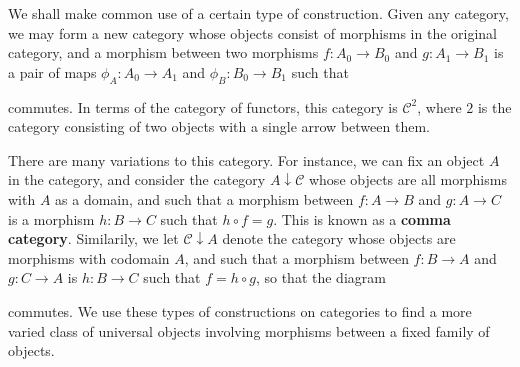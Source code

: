We shall make common use of a certain type of construction. Given any category, we may form a new category whose objects consist of morphisms in the original category, and a morphism between two morphisms $f: A_0 \to B_0$ and $g: A_1 \to B_1$ is a pair of maps $\phi_A: A_0 \to A_1$ and $\phi_B: B_0 \to B_1$ such that
%
\begin{center}
\end{center}
%
commutes. In terms of the category of functors, this category is $\mathcal{C}^2$, where $2$ is the category consisting of two objects with a single arrow between them.

There are many variations to this category. For instance, we can fix an object $A$ in the category, and consider the category $A \downarrow \mathcal{C}$ whose objects are all morphisms with $A$ as a domain, and such that a morphism between $f: A \to B$ and $g: A \to C$ is a morphism $h: B \to C$ such that $h \circ f = g$. This is known as a {\bf comma category}. Similarily, we let $\mathcal{C} \downarrow A$ denote the category whose objects are morphisms with codomain $A$, and such that a morphism between $f: B \to A$ and $g: C \to A$ is $h: B \to C$ such that $f = h \circ g$, so that the diagram
%
\begin{center}
\end{center}
%
commutes. We use these types of constructions on categories to find a more varied class of universal objects involving morphisms between a fixed family of objects.


